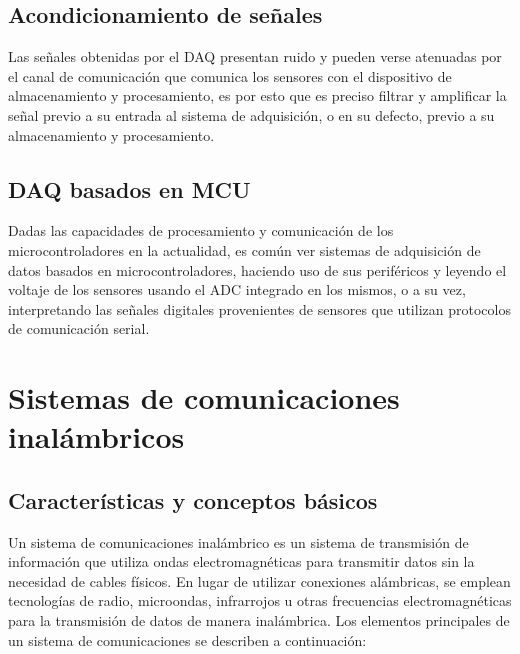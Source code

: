 \subsection{Acondicionamiento de señales} Las señales obtenidas por el DAQ presentan ruido y pueden verse atenuadas por el canal de comunicación que comunica los sensores con el dispositivo de almacenamiento y procesamiento, es por esto que es preciso filtrar y amplificar la señal previo a su entrada al sistema de adquisición, o en su defecto, previo a su almacenamiento y procesamiento.

\subsection{DAQ basados en MCU} Dadas las capacidades de procesamiento y comunicación de los microcontroladores en la actualidad, es común ver sistemas de adquisición de datos basados en microcontroladores, haciendo uso de sus periféricos y leyendo el voltaje de los sensores usando el ADC integrado en los mismos, o a su vez, interpretando las señales digitales provenientes de sensores que utilizan protocolos de comunicación serial.


\section{Sistemas de comunicaciones inalámbricos}

\subsection{Características y conceptos básicos}

Un sistema de comunicaciones inalámbrico es un sistema de transmisión de información que utiliza ondas electromagnéticas para transmitir datos sin la necesidad de cables físicos. En lugar de utilizar conexiones alámbricas, se emplean tecnologías de radio, microondas, infrarrojos u otras frecuencias electromagnéticas para la transmisión de datos de manera inalámbrica. Los elementos principales de un sistema de comunicaciones se describen a continuación:

